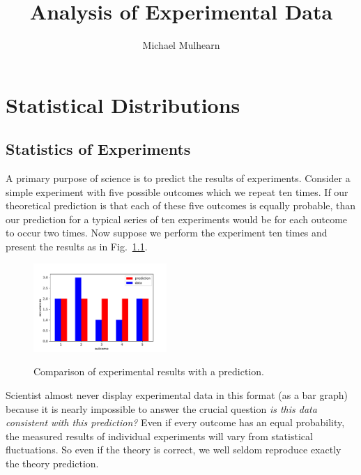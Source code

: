 \documentclass[12pt,oneside]{book}
\begin{document}
\title{Analysis of Experimental Data}
\author{Michael Mulhearn}

\maketitle

\chapter{Statistical Distributions}


\section{Statistics of Experiments}

A primary purpose of science is to predict the results of experiments.
Consider a simple experiment with five possible outcomes which we
repeat ten times.  If our theoretical prediction is that each of these
five outcomes is equally probable, than our prediction for a typical
series of ten experiments would be for each outcome to occur two
times.  Now suppose we perform the experiment ten times and present
the results as in Fig.~\ref{fig:intro}.
\begin{figure}[htbp]
\begin{center}
{\includegraphics[width=0.45\textwidth]{figs/intro.pdf}}
\end{center}
\caption{\label{fig:intro} Comparison of experimental results with a prediction.}
\end{figure}
Scientist almost never display experimental data in this format (as a bar
graph) because it is nearly impossible to answer the crucial question
{\em is this data consistent with this prediction?}  Even if every
outcome has an equal probability, the measured results of individual
experiments will vary from statistical fluctuations.  So even if the
theory is correct, we well seldom reproduce exactly the theory
prediction.
\end{document}
